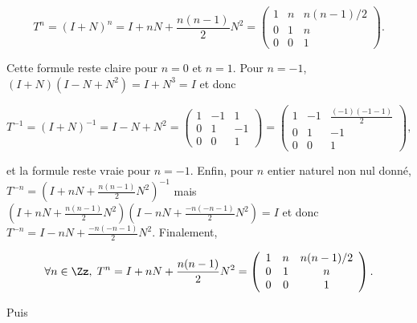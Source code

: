 {\begin{enumerate}
{$$T^n=(I+N)^n=I+nN+\frac{n(n-1)}{2}N^2=\left(
\begin{array}{ccc}
1&n&n(n-1)/2\\
0&1&n\\
0&0&1
\end{array}
\right).$$

Cette formule reste claire pour $n=0$ et $n=1$.
Pour $n=-1$, $(I+N)(I-N+N^2)=I+N^3=I$ et donc

$$T^{-1}=(I+N)^{-1}=I-N+N^2=\left(
\begin{array}{ccc}
1&-1&1\\
0&1&-1\\
0&0&1
\end{array}
\right)=\left(
\begin{array}{ccc}
1&-1&\frac{(-1)(-1-1)}{2}\\
0&1&-1\\
0&0&1
\end{array}
\right),$$

et la formule reste vraie pour $n=-1$. Enfin, pour $n$ entier naturel non nul donné, $T^{-n}=(I+nN+\frac{n(n-1)}{2}N^2)^{-1}$ mais $(I+nN+\frac{n(n-1)}{2}N^2)(I-nN+\frac{-n(-n-1)}{2}N^2)=I$ et donc
$T^{-n}=I-nN+\frac{-n(-n-1)}{2}N^2$. Finalement, 

$$\forall n\in\Zz,\;T^n=I+nN+\frac{n(n-1)}{2}N^2=\left(
\begin{array}{ccc}
1&n&n(n-1)/2\\
0&1&n\\
0&0&1
\end{array}
\right).$$

Puis 

}
\end{enumerate}}
